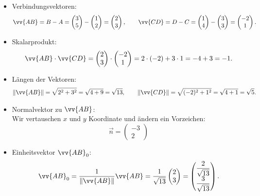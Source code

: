 \begin{loesung}
    \begin{itemize}
        \item[1.] Verbindungsvektoren:
        \[
            \vv{AB} = B - A = 
            \begin{pmatrix}3 \\ 5\end{pmatrix} -
            \begin{pmatrix}1 \\ 2\end{pmatrix} =
            \begin{pmatrix}2 \\ 3\end{pmatrix}, \qquad
            \vv{CD} = D - C =
            \begin{pmatrix}1 \\ 4\end{pmatrix} -
            \begin{pmatrix}3 \\ 3\end{pmatrix} =
            \begin{pmatrix}-2 \\ 1\end{pmatrix}.
        \]
        \item[2.] Skalarprodukt:
        \[
            \vv{AB} \cdot \vv{CD} =
            \begin{pmatrix}2 \\ 3\end{pmatrix} \cdot
            \begin{pmatrix}-2 \\ 1\end{pmatrix}
            = 2 \cdot (-2) + 3 \cdot 1
            = -4 + 3 = -1.
        \]
        \item[3.] Längen der Vektoren:
        \[
            \|\vv{AB}\| = \sqrt{2^2 + 3^2} = \sqrt{4 + 9} = \sqrt{13},
            \qquad
            \|\vv{CD}\| = \sqrt{(-2)^2 + 1^2} = \sqrt{4 + 1} = \sqrt{5}.
        \]
        \item[4.] Normalvektor zu \(\vv{AB}\): \\
        Wir vertauschen $x$ und $y$ Koordinate und ändern ein Vorzeichen:
        \[
            \vec{n} = \begin{pmatrix}-3 \\ 2\end{pmatrix}
        \]
        \item[5.] Einheitsvektor \(\vv{AB}_0\):
        \[
            \vv{AB}_0 = \frac{1}{\|\vv{AB}\|} \vv{AB}
            = \frac{1}{\sqrt{13}}
            \begin{pmatrix}2 \\ 3\end{pmatrix}
            =
            \begin{pmatrix}\dfrac{2}{\sqrt{13}} \\[4pt] \dfrac{3}{\sqrt{13}}\end{pmatrix}.
        \]
    

\end{itemize}
\end{loesung}
